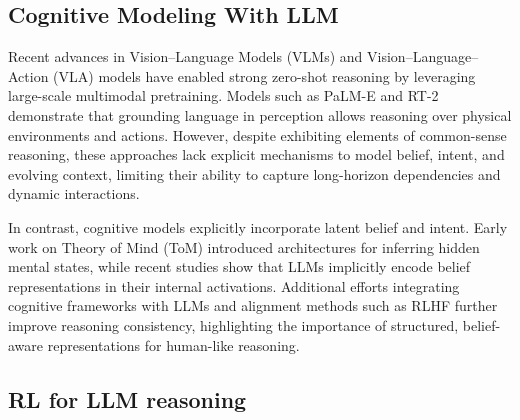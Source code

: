 \documentclass[letterpaper, 10 pt, conference]{ieeeconf}  %
\begin{document}
\subsection{Cognitive Modeling With LLM}
Recent advances in Vision–Language Models (VLMs) and Vision–Language–Action (VLA) models have enabled strong zero-shot reasoning by leveraging large-scale multimodal pretraining. Models such as PaLM-E \cite{driess2023palm} and RT-2 \cite{brohan2023rt2visionlanguageactionmodelstransfer} demonstrate that grounding language in perception allows reasoning over physical environments and actions. However, despite exhibiting elements of common-sense reasoning, these approaches lack explicit mechanisms to model belief, intent, and evolving context, limiting their ability to capture long-horizon dependencies and dynamic interactions.

In contrast, cognitive models explicitly incorporate latent belief and intent. Early work on Theory of Mind (ToM) \cite{pmlr-v80-rabinowitz18a} introduced architectures for inferring hidden mental states, while recent studies \cite{zhu2024language} show that LLMs implicitly encode belief representations in their internal activations. Additional efforts integrating cognitive frameworks with LLMs \cite{wu2024cognitive} and alignment methods such as RLHF \cite{havrilla2024teaching} further improve reasoning consistency, highlighting the importance of structured, belief-aware representations for human-like reasoning.


\subsection{RL for LLM reasoning}
\end{document}
